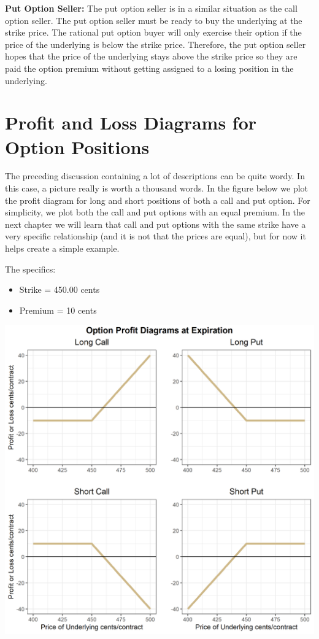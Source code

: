 \documentclass[
  letterpaper,
  DIV=11,
  numbers=noendperiod]{scrreprt}
\begin{document}
\textbf{Put Option Seller:} The put option seller is in a similar
situation as the call option seller. The put option seller must be ready
to buy the underlying at the strike price. The rational put option buyer
will only exercise their option if the price of the underlying is below
the strike price. Therefore, the put option seller hopes that the price
of the underlying stays above the strike price so they are paid the
option premium without getting assigned to a losing position in the
underlying.

\section{\texorpdfstring{\textbf{Profit and Loss Diagrams for Option
Positions}}{Profit and Loss Diagrams for Option Positions}}\label{profit-and-loss-diagrams-for-option-positions}

The preceding discussion containing a lot of descriptions can be quite
wordy. In this case, a picture really is worth a thousand words. In the
figure below we plot the profit diagram for long and short positions of
both a call and put option. For simplicity, we plot both the call and
put options with an equal premium. In the next chapter we will learn
that call and put options with the same strike have a very specific
relationship (and it is not that the prices are equal), but for now it
helps create a simple example.

The specifics:

\begin{itemize}
\item
  Strike = 450.00 cents
\item
  Premium = 10 cents
\end{itemize}

\includegraphics{assets/Options1-optionplot.png}
\end{document}
